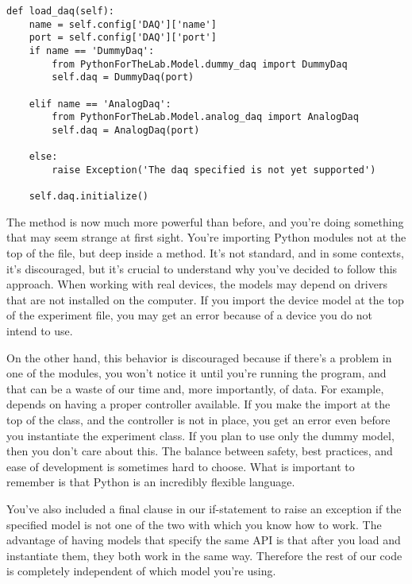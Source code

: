 \begin{verbatim}
def load_daq(self):
    name = self.config['DAQ']['name']
    port = self.config['DAQ']['port']
    if name == 'DummyDaq':
        from PythonForTheLab.Model.dummy_daq import DummyDaq
        self.daq = DummyDaq(port)

    elif name == 'AnalogDaq':
        from PythonForTheLab.Model.analog_daq import AnalogDaq
        self.daq = AnalogDaq(port)

    else:
        raise Exception('The daq specified is not yet supported')

    self.daq.initialize()
\end{verbatim}

The  method is now much more powerful than before, and you're doing something that may seem strange at first sight. You're importing Python modules not at the top of the file, but deep inside a method. It's not standard, and in some contexts, it's discouraged, but it's crucial to understand why you've decided to follow this approach. When working with real devices, the models may depend on drivers that are not installed on the computer. If you import the device model at the top of the experiment file, you may get an error because of a device you do not intend to use.

On the other hand, this behavior is discouraged because if there's a problem in one of the modules, you won't notice it until you're running the program, and that can be a waste of our time and, more importantly, of data. For example,  depends on having a proper controller available. If you make the import at the top of the class, and the controller is not in place, you get an error even before you instantiate the experiment class. If you plan to use only the dummy model, then you don't care about this. The balance between safety, best practices, and ease of development is sometimes hard to choose. What is important to remember is that Python is an incredibly flexible language.

You've also included a final clause in our if-statement to raise an exception if the specified model is not one of the two with which you know how to work. The advantage of having models that specify the same API is that after you load and instantiate them, they both work in the same way. Therefore the rest of our code is completely independent of which model you're using.


